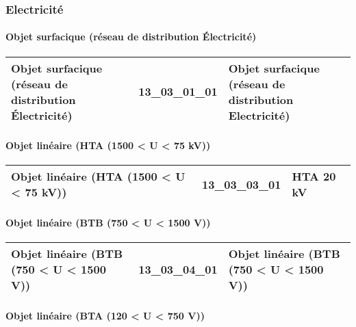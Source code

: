 \documentclass[12pt,titlepage]{book}
\begin{document}
\subsubsection{\large Electricité}
\paragraph{Objet surfacique (réseau de distribution Électricité)}
\noindent
\vspace{\baselineskip}

\renewcommand{\arraystretch}{1.2}
\begin{supertabular}{|p{10cm}|c|p{15cm}|}
 Objet surfacique (réseau de distribution Électricité) & 13\_03\_01\_01 & Objet surfacique (réseau de distribution Electricité)\\
\hline
\end{supertabular}


\paragraph{Objet linéaire (HTA (1500 < U < 75 kV))}
\noindent
\vspace{\baselineskip}

\renewcommand{\arraystretch}{1.2}
\begin{supertabular}{|p{10cm}|c|p{15cm}|}
 Objet linéaire (HTA (1500 < U < 75 kV)) & 13\_03\_03\_01 & HTA 20 kV\\
\hline
\end{supertabular}


\paragraph{Objet linéaire (BTB (750 < U < 1500 V))}
\noindent
\vspace{\baselineskip}

\renewcommand{\arraystretch}{1.2}
\begin{supertabular}{|p{10cm}|c|p{15cm}|}
 Objet linéaire (BTB (750 < U < 1500 V)) & 13\_03\_04\_01 & Objet linéaire (BTB (750 < U < 1500 V))\\
\hline
\end{supertabular}


\paragraph{Objet linéaire (BTA (120 < U < 750 V))}
\noindent
\vspace{\baselineskip}
\end{document}
